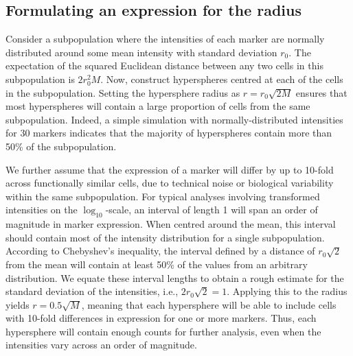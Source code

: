 \documentclass{article}
\begin{document}
\subsection{Formulating an expression for the radius}
Consider a subpopulation where the intensities of each marker are normally distributed around some mean intensity with standard deviation $r_0$.
The expectation of the squared Euclidean distance between any two cells in this subpopulation is $2r_0^2M$.
Now, construct hyperspheres centred at each of the cells in the subpopulation.
Setting the hypersphere radius as $r=r_0\sqrt{2M}$ ensures that most hyperspheres will contain a large proportion of cells from the same subpopulation.
Indeed, a simple simulation with normally-distributed intensities for 30 markers indicates that the majority of hyperspheres contain more than 50\% of the subpopulation.


We further assume that the expression of a marker will differ by up to 10-fold across functionally similar cells, due to technical noise or biological variability within the same subpopulation.
For typical analyses involving transformed intensities on the $\log_{10}$-scale, an interval of length 1 will span an order of magnitude in marker expression.
When centred around the mean, this interval should contain most of the intensity distribution for a single subpopulation.
According to Chebyshev's inequality, the interval defined by a distance of $r_0\sqrt{2}$ from the mean will contain at least 50\% of the values from an arbitrary distribution.
We equate these interval lengths to obtain a rough estimate for the standard deviation of the intensities, i.e., $2r_0\sqrt{2} = 1$.
Applying this to the radius yields $r=0.5\sqrt{M}$, meaning that each hypersphere will be able to include cells with 10-fold differences in expression for one or more markers.
Thus, each hypersphere will contain enough counts for further analysis, even when the intensities vary across an order of magnitude.

\end{document}
